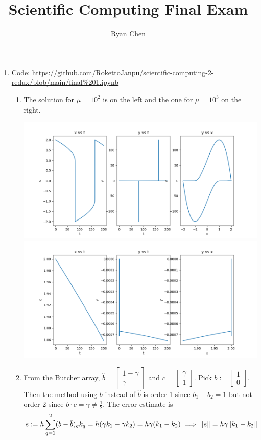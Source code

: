 \documentclass{article}
\title{Scientific Computing Final Exam}
\author{Ryan Chen}
\newcommand{\m}[2][b]{\begin{#1matrix}#2\end{#1matrix}}
\newcommand{\imp}{\implies}
\newcommand{\g}{\gamma}
\begin{document}
	
\maketitle



\begin{enumerate}
	
	
	
\item Code: \url{https://github.com/RokettoJanpu/scientific-computing-2-redux/blob/main/final%201.ipynb}

\begin{enumerate}
	
	
	\item The solution for $\mu=10^2$ is on the left and the one for $\mu=10^3$ on the right.
	\begin{center}
		\includegraphics[scale=.25]{final 1 mu = 100}
		\includegraphics[scale=.25]{final 1 mu = 1000}
	\end{center}

	
	\item From the Butcher array, $\hat b=\m{1-\g\\\g}$ and $c=\m{\g\\1}$. Pick $b:=\m{1\\0}$. Then the method using $b$ instead of $\hat b$ is order 1 since $b_1+b_2=1$ but not order 2 since $b\cdot c=\g\ne\frac12$. The error estimate is
	\[e := h\sum_{q=1}^2(b-\hat b)_qk_q
	= h(\g k_1-\g k_2)
	= h\g(k_1-k_2)
	\imp \norm{e} = h\g\norm{k_1-k_2}\]
	

\end{enumerate}
\end{enumerate}
\end{document}
